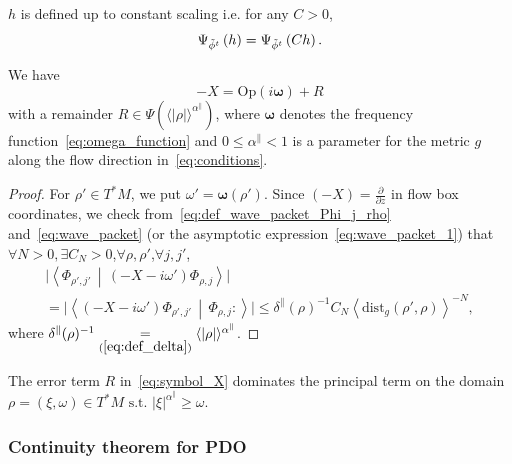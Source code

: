 \documentclass[AHL,Unicode,longabstracts,published]{cedram}
\newcommand*\eq[1]{\underset{(#1)}{=}}
\newcommand{\dist}{\mathrm{dist}}
\newcommand{\Opp}{\mathrm{Op}}
\let\oldtilde\tilde
\renewcommand*{\tilde}[1]{\mathchoice{\widetilde{#1}}{\widetilde{#1}}{\oldtilde{#1}}{\oldtilde{#1}}}
\let\oldexists\exists
\renewcommand*{\exists}{\mathrel{\oldexists}}
\let\oldforall\forall
\renewcommand*{\forall}{\mathrel{\oldforall}}
\begin{document}
\begin{rema}
$h$ is defined up to constant scaling i.e. for any $C>0$,
\[
\Psi_{\tilde{\phi}^{t}}\left(h\right)=\Psi_{\tilde{\phi}^{t}}\left(Ch\right).
\]
\end{rema}

\begin{cBoxB}{}
\begin{prop}\label{prop:We-havewith-a}
We have
\begin{equation}
-X=\Opp \left(i\boldsymbol{\omega}\right)+R\label{eq:symbol_X}
\end{equation}
with a remainder $R\in\Psi(\langle |\rho|\rangle ^{\alpha^{\parallel}})$, where $\boldsymbol{\omega}$ denotes the frequency function~\eqref{eq:omega_function} and $0\leq\alpha^{\parallel}<1$ is a parameter for the metric $g$ along the flow direction in~\eqref{eq:conditions}.
\end{prop}
\end{cBoxB}

\begin{proof}
For $\rho'\in T^{*}M$, we put $\omega'=\boldsymbol{\omega}(\rho')$. Since $(-X)=\frac{\partial}{\partial z}$ in flow box coordinates, we check from~\eqref{eq:def_wave_packet_Phi_j_rho} and~\eqref{eq:wave_packet} (or the asymptotic expression~\eqref{eq:wave_packet_1}) that $\forall N>0,\exists C_{N}>0$,$\forall\rho,\rho'$,$\forall j,j'$,
\begin{multline}\label{eq:X_omega}
\big|\left\langle\Phi_{\rho',j'}\,\middle|\,\left(-X-i\omega'\right)\Phi_{\rho,j}\right\rangle\big|\\
=\big|\left\langle\left(-X-i\omega'\right)\Phi_{\rho',j'}\,\middle|\,\Phi_{\rho,j}:\right\rangle\big|\leq\delta^{\parallel}\left(\rho\right)^{-1}C_{N}\left\langle \dist_{g}\left(\rho',\rho\right)\right\rangle^{-N},
\end{multline}
where $\delta^{\parallel}(\rho)^{-1}\eq{\ref{eq:def_delta}}\langle |\rho|\rangle ^{\alpha^{\parallel}}$.
\end{proof}

\begin{rema}
The error term $R$ in~\eqref{eq:symbol_X} dominates the principal term on the domain $\rho=(\xi,\omega)\in T^{*}M\text{ s.t. }|\xi|^{\alpha^{\parallel}}\geq\omega$.
\end{rema}


\subsubsection{Continuity theorem for PDO}
\end{document}
